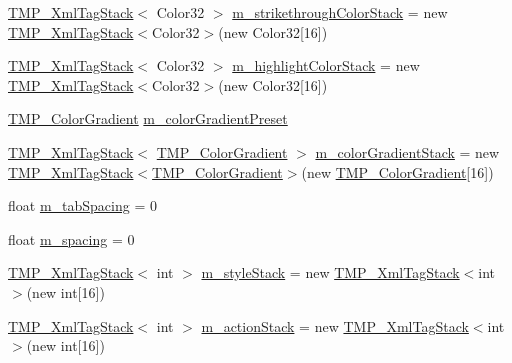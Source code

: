 \begin{DoxyCompactItemize}
\item 
\mbox{\hyperlink{struct_t_m_pro_1_1_t_m_p___xml_tag_stack}{T\+M\+P\+\_\+\+Xml\+Tag\+Stack}}$<$ Color32 $>$ \mbox{\hyperlink{class_t_m_pro_1_1_t_m_p___text_af18159f917aa85cb020bfe63ceeb0006}{m\+\_\+strikethrough\+Color\+Stack}} = new \mbox{\hyperlink{struct_t_m_pro_1_1_t_m_p___xml_tag_stack}{T\+M\+P\+\_\+\+Xml\+Tag\+Stack}}$<$Color32$>$(new Color32\mbox{[}16\mbox{]})
\item 
\mbox{\hyperlink{struct_t_m_pro_1_1_t_m_p___xml_tag_stack}{T\+M\+P\+\_\+\+Xml\+Tag\+Stack}}$<$ Color32 $>$ \mbox{\hyperlink{class_t_m_pro_1_1_t_m_p___text_a65b10f74bbe635a0bbdbceae7f8ca404}{m\+\_\+highlight\+Color\+Stack}} = new \mbox{\hyperlink{struct_t_m_pro_1_1_t_m_p___xml_tag_stack}{T\+M\+P\+\_\+\+Xml\+Tag\+Stack}}$<$Color32$>$(new Color32\mbox{[}16\mbox{]})
\item 
\mbox{\hyperlink{class_t_m_pro_1_1_t_m_p___color_gradient}{T\+M\+P\+\_\+\+Color\+Gradient}} \mbox{\hyperlink{class_t_m_pro_1_1_t_m_p___text_a3f9532b9b26023e97f7a03391ddec240}{m\+\_\+color\+Gradient\+Preset}}
\item 
\mbox{\hyperlink{struct_t_m_pro_1_1_t_m_p___xml_tag_stack}{T\+M\+P\+\_\+\+Xml\+Tag\+Stack}}$<$ \mbox{\hyperlink{class_t_m_pro_1_1_t_m_p___color_gradient}{T\+M\+P\+\_\+\+Color\+Gradient}} $>$ \mbox{\hyperlink{class_t_m_pro_1_1_t_m_p___text_a4217eed6fe5eb53525d29ea242748c8c}{m\+\_\+color\+Gradient\+Stack}} = new \mbox{\hyperlink{struct_t_m_pro_1_1_t_m_p___xml_tag_stack}{T\+M\+P\+\_\+\+Xml\+Tag\+Stack}}$<$\mbox{\hyperlink{class_t_m_pro_1_1_t_m_p___color_gradient}{T\+M\+P\+\_\+\+Color\+Gradient}}$>$(new \mbox{\hyperlink{class_t_m_pro_1_1_t_m_p___color_gradient}{T\+M\+P\+\_\+\+Color\+Gradient}}\mbox{[}16\mbox{]})
\item 
float \mbox{\hyperlink{class_t_m_pro_1_1_t_m_p___text_a096be42ee8cc23934699fa839290510a}{m\+\_\+tab\+Spacing}} = 0
\item 
float \mbox{\hyperlink{class_t_m_pro_1_1_t_m_p___text_aaa5b9355ec32407a48b7a7cfc2efa122}{m\+\_\+spacing}} = 0
\item 
\mbox{\hyperlink{struct_t_m_pro_1_1_t_m_p___xml_tag_stack}{T\+M\+P\+\_\+\+Xml\+Tag\+Stack}}$<$ int $>$ \mbox{\hyperlink{class_t_m_pro_1_1_t_m_p___text_ab9c9bb0657a685306a3525c4b248ac4f}{m\+\_\+style\+Stack}} = new \mbox{\hyperlink{struct_t_m_pro_1_1_t_m_p___xml_tag_stack}{T\+M\+P\+\_\+\+Xml\+Tag\+Stack}}$<$int$>$(new int\mbox{[}16\mbox{]})
\item 
\mbox{\hyperlink{struct_t_m_pro_1_1_t_m_p___xml_tag_stack}{T\+M\+P\+\_\+\+Xml\+Tag\+Stack}}$<$ int $>$ \mbox{\hyperlink{class_t_m_pro_1_1_t_m_p___text_ad80f888ba2af7dd7103a7cf55181664b}{m\+\_\+action\+Stack}} = new \mbox{\hyperlink{struct_t_m_pro_1_1_t_m_p___xml_tag_stack}{T\+M\+P\+\_\+\+Xml\+Tag\+Stack}}$<$int$>$(new int\mbox{[}16\mbox{]})

\end{DoxyCompactItemize}
